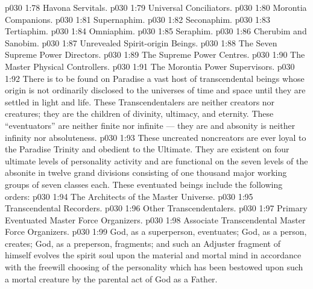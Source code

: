 \vs p030 1:78 \bibnobreakspace Havona Servitals.
\vs p030 1:79 \bibnobreakspace Universal Conciliators.
\vs p030 1:80 \bibnobreakspace Morontia Companions.
\vs p030 1:81 \bibnobreakspace Supernaphim.
\vs p030 1:82 \bibnobreakspace Seconaphim.
\vs p030 1:83 \bibnobreakspace Tertiaphim.
\vs p030 1:84 \bibnobreakspace Omniaphim.
\vs p030 1:85 \bibnobreakspace Seraphim.
\vs p030 1:86 \bibnobreakspace Cherubim and Sanobim.
\vs p030 1:87 \bibnobreakspace Unrevealed Spirit\hyp{}origin Beings.
\vs p030 1:88 \bibnobreakspace The Seven Supreme Power Directors.
\vs p030 1:89 \bibnobreakspace The Supreme Power Centres.
\vs p030 1:90 \bibnobreakspace The Master Physical Controllers.
\vs p030 1:91 \bibnobreakspace The Morontia Power Supervisors.
\vs p030 1:92 \bibnobreakspace{}  There is to be found on Paradise a vast host of transcendental beings whose origin is not ordinarily disclosed to the universes of time and space until they are settled in light and life. These Transcendentalers are neither creators nor creatures; they are the  children of divinity, ultimacy, and eternity. These “eventuators” are neither finite nor infinite --- they are  and absonity is neither infinity nor absoluteness.
\vs p030 1:93 These uncreated noncreators are ever loyal to the Paradise Trinity and obedient to the Ultimate. They are existent on four ultimate levels of personality activity and are functional on the seven levels of the absonite in twelve grand divisions consisting of one thousand major working groups of seven classes each. These eventuated beings include the following orders:
\vs p030 1:94 \bibnobreakspace The Architects of the Master Universe.
\vs p030 1:95 \bibnobreakspace Transcendental Recorders.
\vs p030 1:96 \bibnobreakspace Other Transcendentalers.
\vs p030 1:97 \bibnobreakspace Primary Eventuated Master Force Organizers.
\vs p030 1:98 \bibnobreakspace Associate Transcendental Master Force Organizers.
\vs p030 1:99 \pc God, as a superperson, eventuates; God, as a person, creates; God, as a preperson, fragments; and such an Adjuster fragment of himself evolves the spirit soul upon the material and mortal mind in accordance with the freewill choosing of the personality which has been bestowed upon such a mortal creature by the parental act of God as a Father.
